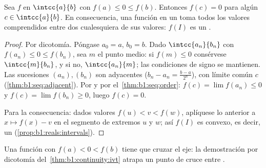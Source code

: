 \begin{theorem}\label{thm:b1:continuity:ivt}
Sea $f$  en $\intcc{a}{b}$ con $f(a) \leq 0 \leq f(b)$.
Entonces $f(c) = 0$ para algún $c \in \intcc{a}{b}$. En
consecuencia, una función  en un  toma todos los
valores comprendidos entre dos cualesquiera de sus valores: $f(I)$ es
un .
\end{theorem}

\begin{proof}
Por dicotomía. Póngase $a_0 = a$, $b_0 = b$. Dado $\intcc{a_n}{b_n}$
con $f(a_n) \leq 0 \leq f(b_n)$, sea $m$ el punto medio: si
$f(m) \leq 0$ consérvese $\intcc{m}{b_n}$, y si no,
$\intcc{a_n}{m}$; las condiciones de signo se mantienen. Las
sucesiones $(a_n), (b_n)$ son adyacentes
($b_n - a_n = \frac{b-a}{2^n}$), con límite común $c$
(\cref{thm:b1:seq:adjacent}). Por  y por
el~\cref{thm:b1:seq:order}: $f(c) = \lim f(a_n) \leq 0$ y
$f(c) = \lim f(b_n) \geq 0$, luego $f(c) = 0$.

Para la consecuencia: dados valores $f(u) < v < f(w)$, aplíquese lo
anterior a $x \mapsto f(x) - v$ en el segmento de extremos $u$ y $w$;
así $f(I)$ es convexo, es decir, un 
(\cref{prop:b1:reals:intervals}).
\end{proof}

\begin{omfigure}

{\small Una función  con $f(a) < 0 < f(b)$ tiene que cruzar
el eje: la demostración por dicotomía del~\cref{thm:b1:continuity:ivt}
atrapa un punto de cruce entre .}
\end{omfigure}

